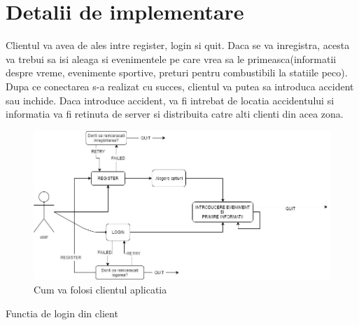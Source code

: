 \documentclass[runningheads]{llncs}
\begin{document}
\section {Detalii de implementare}
Clientul va avea de ales intre register, login si quit. Daca se va inregistra, acesta va trebui sa isi aleaga si evenimentele pe care vrea sa le primeasca(informatii despre vreme, evenimente sportive, preturi pentru combustibili la statiile peco). Dupa ce conectarea s-a realizat cu succes, clientul va putea sa introduca accident sau inchide. Daca introduce accident, va fi intrebat de locatia accidentului si informatia va fi retinuta de server si distribuita catre alti clienti din acea zona.\\
\begin{figure}[H]
\includegraphics[width=\textwidth]{use-case.jpg}
\caption{Cum va folosi clientul aplicatia}
\end{figure}
Functia de login din client
\end{document}
